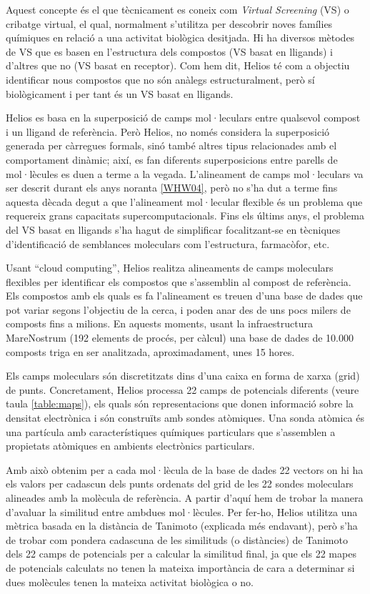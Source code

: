 Aquest concepte és el que tècnicament es coneix com \emph{Virtual Screening} (VS) o cribatge virtual,
el qual, normalment s'utilitza per descobrir noves famílies químiques en relació a una activitat biològica
desitjada. Hi ha diversos mètodes de VS que es basen en l'estructura dels compostos (VS basat en lligands) i d'altres que no
(VS basat en receptor). Com hem dit, Helios té com a objectiu identificar nous compostos que no són anàlegs estructuralment,
però sí biològicament i per tant és un VS basat en lligands.

Helios es basa en la superposició de camps mol·leculars entre qualsevol compost i un lligand de
referència. Però Helios, no només considera la superposició generada per càrregues formals, sinó
també altres tipus relacionades amb el comportament dinàmic; així, es fan diferents superposicions
entre parells de mol·lècules es duen a terme a la vegada. L'alineament de camps mol·leculars va ser descrit durant els anys noranta \ref{WHW04},
però no s'ha dut a terme fins aquesta dècada degut a que l'alineament mol·lecular flexible és un problema que requereix
grans capacitats supercomputacionals. Fins els últims anys, el problema del VS basat en lligands s'ha hagut de simplificar
focalitzant-se en tècniques d'identificació de semblances moleculars com l'estructura, farmacòfor, etc. 

Usant ``cloud computing'', Helios realitza alineaments de camps moleculars flexibles per identificar els compostos que s'assemblin
al compost de referència. Els compostos amb els quals es fa l'alineament es treuen d'una base de dades que pot variar segons l'objectiu de la cerca, i
poden anar des de uns pocs milers de composts fins a milions. En aquests moments, usant la infraestructura MareNostrum (192 elements de procés, per càlcul)
una base de dades de 10.000 composts triga en ser analitzada, aproximadament, unes 15 hores.

Els camps moleculars són discretitzats dins d'una caixa en forma de xarxa (grid) de punts. Concretament, Helios processa 22 camps de potencials diferents (veure taula \ref{table:maps}), els quals són representacions que donen informació sobre la densitat electrònica i són construïts amb sondes atòmiques. Una sonda atòmica és una partícula amb
característiques químiques particulars que s'assemblen a propietats atòmiques en ambients electrònics particulars. 

Amb això obtenim per a cada mol·lècula de la base de dades 22 vectors on hi ha els valors per cadascun dels punts ordenats del grid de les 22 sondes moleculars
alineades amb la molècula de referència. A partir d'aquí hem de trobar la manera d'avaluar la similitud entre ambdues mol·lècules. Per fer-ho, Helios utilitza una mètrica
basada en la distància de Tanimoto (explicada més endavant), però s'ha de trobar com pondera cadascuna de les similituds (o distàncies) de Tanimoto dels 22 camps de
potencials per a calcular la similitud final, ja que els 22 mapes de potencials calculats no tenen la mateixa importància de cara a determinar si dues molècules tenen
la mateixa activitat biològica o no.

